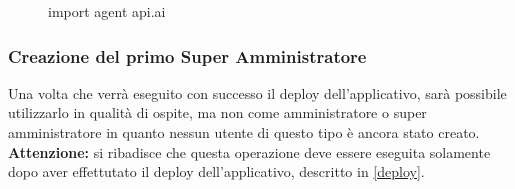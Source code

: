 \begin{figure}[H]
	\caption{import agent api.ai}\label{fig:importAgent}
\end{figure}

\subsubsection{Creazione del primo Super Amministratore}

Una volta che verrà eseguito con successo il deploy dell'applicativo, sarà possibile utilizzarlo in qualità di ospite, ma non come amministratore o super amministratore in quanto nessun utente di questo tipo è ancora stato creato.\\

\textbf{Attenzione: }si ribadisce che questa operazione deve essere eseguita solamente dopo aver effettutato il deploy dell'applicativo, descritto in \ref{deploy}.\\

